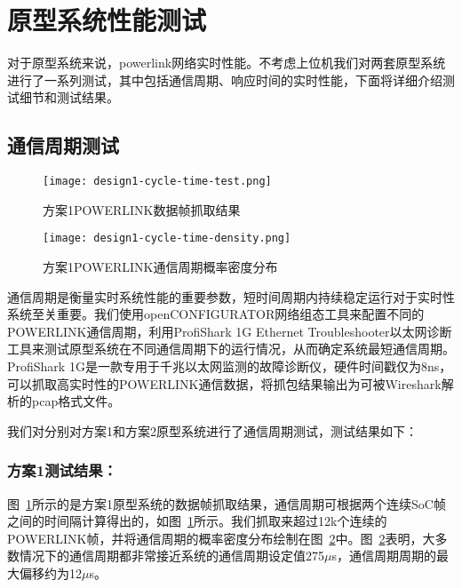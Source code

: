 \section{原型系统性能测试}

\label{section:原型系统性能测试}

对于原型系统来说，powerlink网络实时性能。不考虑上位机我们对两套原型系统进行了一系列测试，其中包括通信周期、响应时间的实时性能，下面将详细介绍测试细节和测试结果。

\subsection{通信周期测试}

\begin{figure}[!htb]
  \centering
  \texttt{[image: design1-cycle-time-test.png]}
  \caption{方案1POWERLINK数据帧抓取结果}
  \label{fig:design1-cycle-time-test}
\end{figure}

\begin{figure}[!htb]
  \centering
  \texttt{[image: design1-cycle-time-density.png]}
  \caption{方案1POWERLINK通信周期概率密度分布}
  \label{fig:design1-cycle-time-density}
\end{figure}

通信周期是衡量实时系统性能的重要参数，短时间周期内持续稳定运行对于实时性系统至关重要。我们使用openCONFIGURATOR网络组态工具来配置不同的POWERLINK通信周期，利用ProfiShark 1G Ethernet Troubleshooter以太网诊断工具来测试原型系统在不同通信周期下的运行情况，从而确定系统最短通信周期。ProfiShark 1G是一款专用于千兆以太网监测的故障诊断仪，硬件时间戳仅为8ns，可以抓取高实时性的POWERLINK通信数据，将抓包结果输出为可被Wireshark解析的pcap格式文件。

我们对分别对方案1和方案2原型系统进行了通信周期测试，测试结果如下：

\subsubsection{方案1测试结果：}
图~\ref{fig:design1-cycle-time-test}所示的是方案1原型系统的数据帧抓取结果，通信周期可根据两个连续SoC帧之间的时间隔计算得出的，如图~\ref{fig:design1-cycle-time-test}所示。我们抓取来超过12k个连续的POWERLINK帧，并将通信周期的概率密度分布绘制在图~\ref{fig:design1-cycle-time-density}中。图~\ref{fig:design1-cycle-time-density}表明，大多数情况下的通信周期都非常接近系统的通信周期设定值275$\mu$s，通信周期周期的最大偏移约为12$\mu$s。

